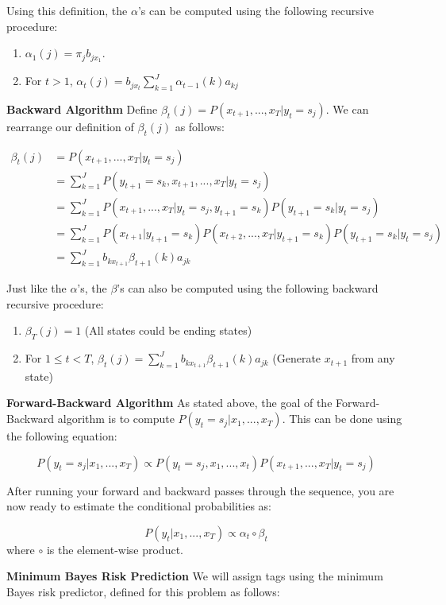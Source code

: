 \documentclass[11pt,addpoints,answers]{exam}
\numberwithin{equation}{section} %
\numberwithin{figure}{section} %
\numberwithin{table}{section} %
\begin{document}
Using this definition, the $\alpha$'s can be computed using the following recursive procedure:
\begin{enumerate}
    \item $\alpha_1(j)=\pi_jb_{jx_1}$. 
    \item For $t > 1$, $\alpha_{t}(j)=b_{jx_{t}}\sum_{k=1}^{J}\alpha_{t-1}(k)a_{kj}$ 
\end{enumerate}


\textbf{Backward Algorithm}
Define $\beta_t(j) = P(x_{t+1},...,x_T|y_t=s_j)$. We can rearrange our definition of $\beta_t(j)$ as follows:

\begin{align}
    \label{eqn:beta}
    \beta_t(j) &= P(x_{t+1},...,x_T|y_t=s_j)\nonumber\\
    &= \sum_{k=1}^JP(y_{t+1}=s_k,x_{t+1},...,x_T|y_t=s_j)\nonumber\\
    &= \sum_{k=1}^JP(x_{t+1},...,x_T|y_t=s_j,y_{t+1}=s_k)P(y_{t+1}=s_k|y_t=s_j)\nonumber\\
    &= \sum_{k=1}^JP(x_{t+1}|y_{t+1}=s_k)P(x_{t+2},...,x_T|y_{t+1}=s_k)P(y_{t+1}=s_k|y_t=s_j)\nonumber\\
    &= \sum_{k=1}^J b_{kx_{t+1}}\beta_{t+1}(k)a_{jk}
\end{align}


Just like the $\alpha$'s, the $\beta$'s can also be computed using the following backward recursive procedure:

\begin{enumerate}
    \item $\beta_T(j) = 1$ (All states could be ending states)
    \item  For $1\leq t <T$, $\beta_t(j) = \sum_{k=1}^{J}b_{kx_{t+1}}\beta_{t+1}(k)a_{jk}$ (Generate $x_{t+1}$ from any state)
\end{enumerate}


\textbf{Forward-Backward Algorithm}
As stated above, the goal of the Forward-Backward algorithm is to compute $P(y_t =s_j | x_1,...,x_T)$. This can be done using the following equation:

$$P(y_t =s_j | x_1,...,x_T) \propto P(y_t=s_j, x_1,...,x_{t})P(x_{t+1},...,x_T|y_t=s_j) $$

After running your forward and backward passes through the sequence, you are now ready to estimate the conditional probabilities as:

$$P(y_t | x_1,...,x_T) \propto \alpha_t\circ\beta_t$$
where $\circ$ is the element-wise product.

\textbf{Minimum Bayes Risk Prediction}
We will assign tags using the minimum Bayes risk predictor, defined for this problem as follows:
\end{document}
